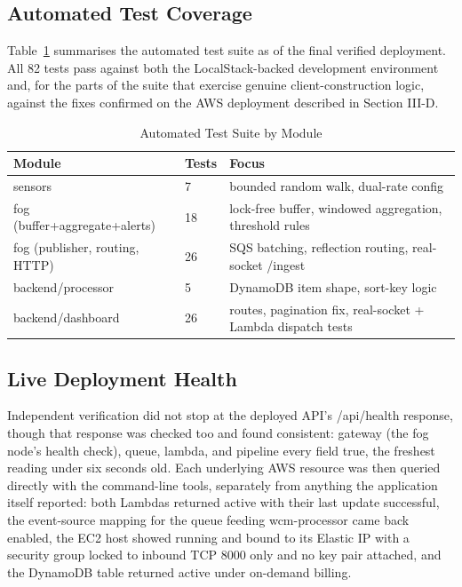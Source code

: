 \documentclass[conference,a4paper]{IEEEtran}
\begin{document}
\subsection{Automated Test Coverage}

Table~\ref{tab:tests} summarises the automated test suite as of the final verified deployment. All 82 tests pass against both the LocalStack-backed development environment and, for the parts of the suite that exercise genuine client-construction logic, against the fixes confirmed on the AWS deployment described in Section III-D.

\begin{table}[!t]
\caption{Automated Test Suite by Module}
\label{tab:tests}
\centering\footnotesize
\setlength{\tabcolsep}{3pt}
\begin{tabular}{p{1.26in}p{0.32in}p{1.64in}}
\hline
\textbf{Module} & \textbf{Tests} & \textbf{Focus} \\
\hline
sensors & 7 & bounded random walk, dual-rate config \\
fog (buffer+aggregate+alerts) & 18 & lock-free buffer, windowed aggregation, threshold rules \\
fog (publisher, routing, HTTP) & 26 & SQS batching, reflection routing, real-socket /ingest \\
backend/processor & 5 & DynamoDB item shape, sort-key logic \\
backend/dashboard & 26 & routes, pagination fix, real-socket + Lambda dispatch tests \\
\hline
\end{tabular}
\end{table}

\subsection{Live Deployment Health}

Independent verification did not stop at the deployed API's /api/health response, though that response was checked too and found consistent: gateway (the fog node's health check), queue, lambda, and pipeline every field true, the freshest reading under six seconds old. Each underlying AWS resource was then queried directly with the command-line tools, separately from anything the application itself reported: both Lambdas returned active with their last update successful, the event-source mapping for the queue feeding wcm-processor came back enabled, the EC2 host showed running and bound to its Elastic IP with a security group locked to inbound TCP 8000 only and no key pair attached, and the DynamoDB table returned active under on-demand billing.
\end{document}
